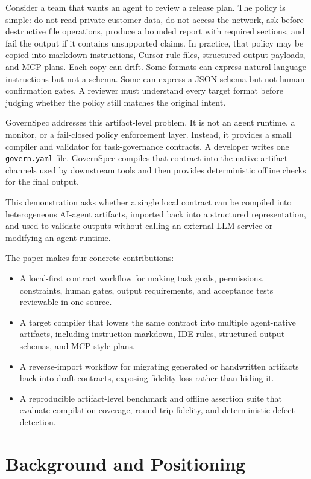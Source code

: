 \documentclass[10pt,conference]{IEEEtran}
\begin{document}
Consider a team that wants an agent to review a release plan. The policy is simple:
do not read private customer data, do not access the network, ask before destructive
file operations, produce a bounded report with required sections, and fail the output
if it contains unsupported claims. In practice, that policy may be copied into
markdown instructions, Cursor rule files, structured-output payloads, and MCP plans.
Each copy can drift. Some formats can express natural-language instructions but not a
schema. Some can express a JSON schema but not human confirmation gates. A reviewer
must understand every target format before judging whether the policy still matches
the original intent.

GovernSpec addresses this artifact-level problem. It is not an agent runtime, a
monitor, or a fail-closed policy enforcement layer. Instead, it provides a small
compiler and validator for task-governance contracts. A developer writes one
\texttt{govern.yaml} file. GovernSpec compiles that contract into the native artifact
channels used by downstream tools and then provides deterministic offline checks for
the final output.

This demonstration asks whether a single local contract can be compiled into
heterogeneous AI-agent artifacts, imported back into a structured representation, and
used to validate outputs without calling an external LLM service or modifying an
agent runtime.

The paper makes four concrete contributions:
\begin{itemize}
  \item A local-first contract workflow for making task goals, permissions,
  constraints, human gates, output requirements, and acceptance tests reviewable in
  one source.
  \item A target compiler that lowers the same contract into multiple agent-native
  artifacts, including instruction markdown, IDE rules, structured-output schemas,
  and MCP-style plans.
  \item A reverse-import workflow for migrating generated or handwritten artifacts
  back into draft contracts, exposing fidelity loss rather than hiding it.
  \item A reproducible artifact-level benchmark and offline assertion suite that
  evaluate compilation coverage, round-trip fidelity, and deterministic defect
  detection.
\end{itemize}

\section{Background and Positioning}
\end{document}
